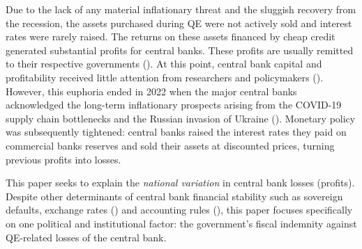 \documentclass[
  a4paper,
  abstract=true]{scrartcl}
\theoremstyle{definition}
\begin{document}
Due to the lack of any material inflationary threat and the sluggish
recovery from the recession, the assets purchased during QE were not
actively sold and interest rates were rarely raised. The returns on
these assets financed by cheap credit generated substantial profits for
central banks. These profits are usually remitted to their respective
governments (). At
this point, central bank capital and profitability received little
attention from researchers and policymakers
(). However,
this euphoria ended in 2022 when the major central banks acknowledged
the long-term inflationary prospects arising from the COVID-19 supply
chain bottlenecks and the Russian invasion of Ukraine
(). Monetary
policy was subsequently tightened: central banks raised the interest
rates they paid on commercial banks reserves and sold their assets at
discounted prices, turning previous profits into losses.

This paper seeks to explain the \emph{national variation} in central
bank losses (profits). Despite other determinants of central bank
financial stability such as sovereign defaults, exchange rates
() and accounting rules
(), this paper
focuses specifically on one political and institutional factor: the
government's fiscal indemnity against QE-related losses of the central
bank.
\end{document}
